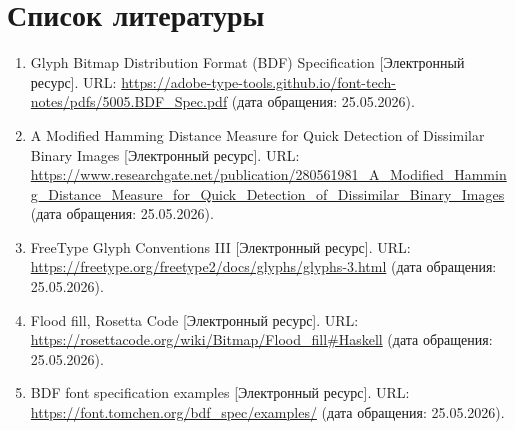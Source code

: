 \section*{Список литературы}

\begingroup
\sloppy
\begin{enumerate}
    \item Glyph Bitmap Distribution Format (BDF) Specification [Электронный ресурс]. URL: \url{https://adobe-type-tools.github.io/font-tech-notes/pdfs/5005.BDF_Spec.pdf} (дата обращения: 25.05.2026).
    \item A Modified Hamming Distance Measure for Quick Detection of Dissimilar Binary Images [Электронный ресурс]. URL: \url{https://www.researchgate.net/publication/280561981_A_Modified_Hamming_Distance_Measure_for_Quick_Detection_of_Dissimilar_Binary_Images} (дата обращения: 25.05.2026).
    \item FreeType Glyph Conventions III [Электронный ресурс]. URL: \url{https://freetype.org/freetype2/docs/glyphs/glyphs-3.html} (дата обращения: 25.05.2026).
    \item Flood fill, Rosetta Code [Электронный ресурс]. URL: \url{https://rosettacode.org/wiki/Bitmap/Flood_fill#Haskell} (дата обращения: 25.05.2026).
    \item BDF font specification examples [Электронный ресурс]. URL: \url{https://font.tomchen.org/bdf_spec/examples/} (дата обращения: 25.05.2026).
\end{enumerate}
\endgroup

\newpage
